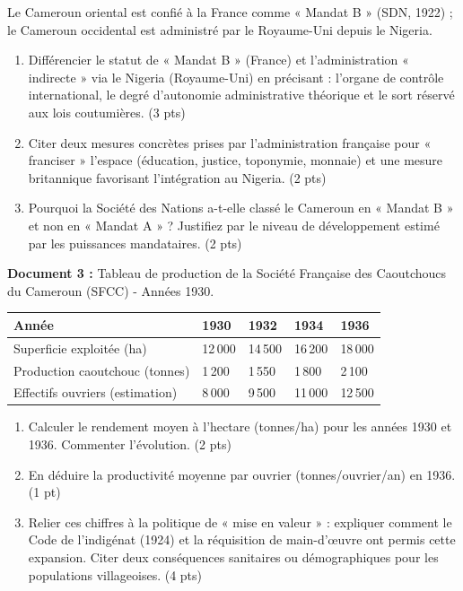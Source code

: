 \documentclass[11pt]{article}
\begin{document}
\begin{exercice}
Le Cameroun oriental est confié à la France comme « Mandat B » (SDN, 1922) ; le Cameroun occidental est administré par le Royaume-Uni depuis le Nigeria.
\begin{enumerate}
    \item Différencier le statut de « Mandat B » (France) et l'administration « indirecte » via le Nigeria (Royaume-Uni) en précisant : l'organe de contrôle international, le degré d'autonomie administrative théorique et le sort réservé aux lois coutumières. (3 pts)
    \item Citer deux mesures concrètes prises par l'administration française pour « franciser » l'espace (éducation, justice, toponymie, monnaie) et une mesure britannique favorisant l'intégration au Nigeria. (2 pts)
    \item Pourquoi la Société des Nations a-t-elle classé le Cameroun en « Mandat B » et non en « Mandat A » ? Justifiez par le niveau de développement estimé par les puissances mandataires. (2 pts)
\end{enumerate}
\end{exercice}

\begin{exercice}
\textbf{Document 3 :} Tableau de production de la Société Française des Caoutchoucs du Cameroun (SFCC) - Années 1930.
\begin{center}
\begin{tabularx}{\linewidth}{lXXXX}
\toprule
Année & 1930 & 1932 & 1934 & 1936 \\
\midrule
Superficie exploitée (ha) & 12\,000 & 14\,500 & 16\,200 & 18\,000 \\
Production caoutchouc (tonnes) & 1\,200 & 1\,550 & 1\,800 & 2\,100 \\
Effectifs ouvriers (estimation) & 8\,000 & 9\,500 & 11\,000 & 12\,500 \\
\bottomrule
\end{tabularx}
\end{center}
\begin{enumerate}
    \item Calculer le rendement moyen à l'hectare (tonnes/ha) pour les années 1930 et 1936. Commenter l'évolution. (2 pts)
    \item En déduire la productivité moyenne par ouvrier (tonnes/ouvrier/an) en 1936. (1 pt)
    \item Relier ces chiffres à la politique de « mise en valeur » : expliquer comment le Code de l'indigénat (1924) et la réquisition de main-d'œuvre ont permis cette expansion. Citer deux conséquences sanitaires ou démographiques pour les populations villageoises. (4 pts)
\end{enumerate}
\end{exercice}
\end{document}
